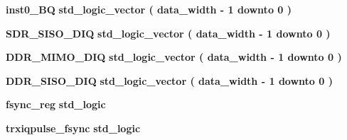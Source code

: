 \begin{DoxyCompactItemize}
\item 
{\bf inst0\+\_\+\+BQ} {\bfseries \textcolor{comment}{std\+\_\+logic\+\_\+vector}\textcolor{vhdlchar}{ }\textcolor{vhdlchar}{(}\textcolor{vhdlchar}{ }\textcolor{vhdlchar}{ }\textcolor{vhdlchar}{ }\textcolor{vhdlchar}{ }{\bfseries {\bf data\+\_\+width}} \textcolor{vhdlchar}{-\/}\textcolor{vhdlchar}{ } \textcolor{vhdldigit}{1} \textcolor{vhdlchar}{ }\textcolor{keywordflow}{downto}\textcolor{vhdlchar}{ }\textcolor{vhdlchar}{ } \textcolor{vhdldigit}{0} \textcolor{vhdlchar}{ }\textcolor{vhdlchar}{)}\textcolor{vhdlchar}{ }} 
\item 
{\bf S\+D\+R\+\_\+\+S\+I\+S\+O\+\_\+\+D\+IQ} {\bfseries \textcolor{comment}{std\+\_\+logic\+\_\+vector}\textcolor{vhdlchar}{ }\textcolor{vhdlchar}{(}\textcolor{vhdlchar}{ }\textcolor{vhdlchar}{ }\textcolor{vhdlchar}{ }\textcolor{vhdlchar}{ }{\bfseries {\bf data\+\_\+width}} \textcolor{vhdlchar}{-\/}\textcolor{vhdlchar}{ } \textcolor{vhdldigit}{1} \textcolor{vhdlchar}{ }\textcolor{keywordflow}{downto}\textcolor{vhdlchar}{ }\textcolor{vhdlchar}{ } \textcolor{vhdldigit}{0} \textcolor{vhdlchar}{ }\textcolor{vhdlchar}{)}\textcolor{vhdlchar}{ }} 
\item 
{\bf D\+D\+R\+\_\+\+M\+I\+M\+O\+\_\+\+D\+IQ} {\bfseries \textcolor{comment}{std\+\_\+logic\+\_\+vector}\textcolor{vhdlchar}{ }\textcolor{vhdlchar}{(}\textcolor{vhdlchar}{ }\textcolor{vhdlchar}{ }\textcolor{vhdlchar}{ }\textcolor{vhdlchar}{ }{\bfseries {\bf data\+\_\+width}} \textcolor{vhdlchar}{-\/}\textcolor{vhdlchar}{ } \textcolor{vhdldigit}{1} \textcolor{vhdlchar}{ }\textcolor{keywordflow}{downto}\textcolor{vhdlchar}{ }\textcolor{vhdlchar}{ } \textcolor{vhdldigit}{0} \textcolor{vhdlchar}{ }\textcolor{vhdlchar}{)}\textcolor{vhdlchar}{ }} 
\item 
{\bf D\+D\+R\+\_\+\+S\+I\+S\+O\+\_\+\+D\+IQ} {\bfseries \textcolor{comment}{std\+\_\+logic\+\_\+vector}\textcolor{vhdlchar}{ }\textcolor{vhdlchar}{(}\textcolor{vhdlchar}{ }\textcolor{vhdlchar}{ }\textcolor{vhdlchar}{ }\textcolor{vhdlchar}{ }{\bfseries {\bf data\+\_\+width}} \textcolor{vhdlchar}{-\/}\textcolor{vhdlchar}{ } \textcolor{vhdldigit}{1} \textcolor{vhdlchar}{ }\textcolor{keywordflow}{downto}\textcolor{vhdlchar}{ }\textcolor{vhdlchar}{ } \textcolor{vhdldigit}{0} \textcolor{vhdlchar}{ }\textcolor{vhdlchar}{)}\textcolor{vhdlchar}{ }} 
\item 
{\bf fsync\+\_\+reg} {\bfseries \textcolor{comment}{std\+\_\+logic}\textcolor{vhdlchar}{ }} 
\item 
{\bf trxiqpulse\+\_\+fsync} {\bfseries \textcolor{comment}{std\+\_\+logic}\textcolor{vhdlchar}{ }} 
\end{DoxyCompactItemize}
